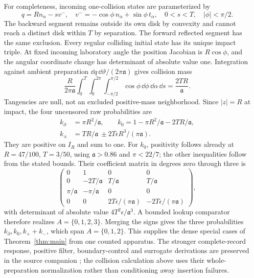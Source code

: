 \documentclass[11pt]{amsart}
\theoremstyle{definition}\newtheorem{definition}[theorem]{Definition}
\theoremstyle{remark}\newtheorem{remark}[theorem]{Remark}
\begin{document}
For completeness, incoming one-collision states are parameterized by
\[
 q=Rn_\alpha-sv^-,\quad
 v^-=-\cos\phi\,n_\alpha+\sin\phi\,t_\alpha,
 \quad 0<s<T,\quad |\phi|<\pi/2.
\]
The backward segment remains outside its own disk by convexity and cannot
reach a distinct disk within $T$ by separation. The forward reflected
segment has the same exclusion. Every regular colliding initial state
has its unique impact triple. At fixed incoming laboratory angle the
position Jacobian is $R\cos\phi$, and the angular coordinate change
has determinant of absolute value one. Integration against ambient
preparation $\dd q\,\dd\vartheta/(2\pi\mathfrak a)$ gives collision
mass
\[
 \frac{R}{2\pi\mathfrak a}
      \int_0^T\int_0^{2\pi}\int_{-\pi/2}^{\pi/2}
                       \cos\phi\,\dd\phi\,\dd\alpha\,\dd s
 =\frac{2TR}{\mathfrak a}.
\]
Tangencies are null, not an excluded positive-mass neighborhood.
Since $|z|=R$ at impact, the four uncensored raw probabilities are
\begin{equation}\label{eq:mechanical-cells}
 \begin{split}
 k_\partial&=\pi R^2/\mathfrak a,\qquad
 k_0=1-\pi R^2/\mathfrak a-2TR/\mathfrak a,\\
 k_\pm&=TR/\mathfrak a\ \pm 2T\epsilon R^3/(\pi\mathfrak a).
 \end{split}
\end{equation}
They are positive on $I_R$ and sum to one. For $k_0$, positivity follows
already at $R=47/100$, $T=3/50$, using $\mathfrak a>0.86$ and
$\pi<22/7$; the other inequalities follow from the stated bounds.
Their coefficient matrix in degrees zero through three is
\[
 \begin{pmatrix}
 0&1&0&0\\
 0&-2T/\mathfrak a&T/\mathfrak a&T/\mathfrak a\\
 \pi/\mathfrak a&-\pi/\mathfrak a&0&0\\
 0&0&2T\epsilon/(\pi\mathfrak a)&-2T\epsilon/(\pi\mathfrak a)
 \end{pmatrix},
\]
with determinant of absolute value $4T^2\epsilon/\mathfrak a^3$.
A bounded lookup comparator therefore realizes $A=\{0,1,2,3\}$.
Merging the signs gives the three probabilities
$k_\partial,k_0,k_++k_-$, which span $A=\{0,1,2\}$.
This supplies the dense special cases of Theorem~\ref{thm:main} from
one counted apparatus. The stronger complete-record response, positive
filter, boundary-control and surrogate derivations are preserved in the
source companion \cite{A1v5}; the collision calculation above uses their
whole-preparation normalization rather than conditioning away insertion
failures.
\end{document}
